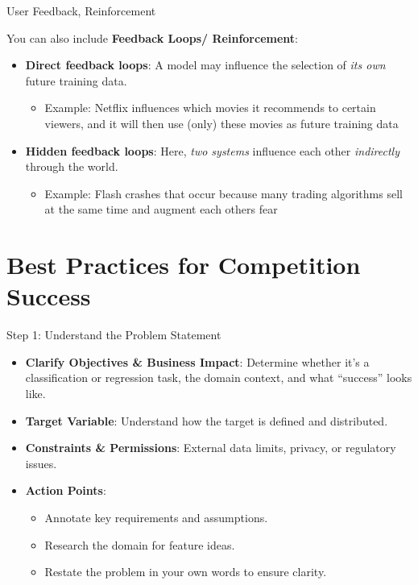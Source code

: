 \documentclass[ignorenonframetext,]{beamer}
\providecommand{\tightlist}{%
  \setlength{\itemsep}{0pt}\setlength{\parskip}{0pt}}
\begin{document}
\begin{frame}{User Feedback, Reinforcement}
\label{user-feedback-and-acceptance}

You can also include \textbf{Feedback Loops/ Reinforcement}:

\begin{itemize}
\tightlist
\item
  \textbf{Direct feedback loops}: A model may influence the selection of
  \emph{its own} future training data.

  \begin{itemize}
  \tightlist
  \item
    Example: Netflix influences which movies it recommends to certain
    viewers, and it will then use (only) these movies as future training
    data
  \end{itemize}
\item
  \textbf{Hidden feedback loops}: Here, \emph{two systems} influence
  each other \emph{indirectly} through the world.

  \begin{itemize}
  \tightlist
  \item
    Example: Flash crashes that occur because many trading algorithms
    sell at the same time and augment each others fear
  \end{itemize}
\end{itemize}
\end{frame}



\section{Best Practices for Competition Success}
\begin{frame}{Step 1: Understand the Problem Statement}
\begin{itemize}
  \item \textbf{Clarify Objectives \& Business Impact}: Determine whether it’s a classification or regression task, the domain context, and what “success” looks like.
  \item \textbf{Target Variable}: Understand how the target is defined and distributed.
  \item \textbf{Constraints \& Permissions}: External data limits, privacy, or regulatory issues.
  \item \textbf{Action Points}:
    \begin{itemize}
      \item Annotate key requirements and assumptions.
      \item Research the domain for feature ideas.
      \item Restate the problem in your own words to ensure clarity.
    \end{itemize}
\end{itemize}
\end{frame}
\end{document}
